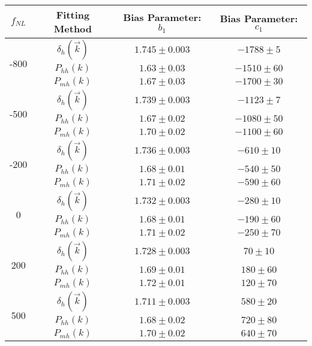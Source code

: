 \documentclass[10pt,letterpaper,final]{iopart}
\numberwithin{equation}{subsection}
\begin{document}
\begin{table}[!htb]
\begin{center}
	\begin{tabular}{ | c | c | c | c |}
	
	\hline 
	\textbf{$f_{NL}$} & \textbf{Fitting Method} & \textbf{Bias Parameter: $b_1$} & \textbf{Bias Parameter: $c_1$} \\ \hline \hline
	
	\multirow{3}{*}{-800} &$\delta_h(\vec{k})$ & $1.745 \pm 0.003$ & $-1788 \pm 5$\\ \cline{2-4}
	&$P_{hh}(k)$ & $1.63 \pm 0.03$ & $-1510 \pm 60$ \\ \cline{2-4}
	&$P_{mh}(k)$ & $1.67 \pm 0.03$ & $-1700 \pm 30$ \\ \hline \hline
	
	\multirow{3}{*}{-500} &$\delta_h(\vec{k})$ & $1.739 \pm 0.003$ & $-1123 \pm 7$\\ \cline{2-4}
	&$P_{hh}(k)$ & $1.67 \pm 0.02$ & $-1080 \pm 50$\\ \cline{2-4}
	&$P_{mh}(k)$ & $1.70 \pm 0.02$ & $-1100 \pm 60$ \\ \hline \hline
	
	\multirow{3}{*}{-200} &$\delta_h(\vec{k})$ & $1.736 \pm 0.003$ & $-610 \pm 10$\\ \cline{2-4}
	&$P_{hh}(k)$ & $1.68 \pm 0.01$ & $-540 \pm 50$ \\ \cline{2-4}
	&$P_{mh}(k)$ & $1.71 \pm 0.02$ & $-590 \pm 60$ \\ \hline \hline
	
	\multirow{3}{*}{0} &$\delta_h(\vec{k})$ & $1.732 \pm 0.003$  & $-280 \pm 10 $\\ \cline{2-4}
	&$P_{hh}(k)$ & $1.68 \pm 0.01$ & $-190 \pm 60$ \\ \cline{2-4}
	&$P_{mh}(k)$ & $1.71 \pm 0.02$ & $-250 \pm 70$ \\ \hline \hline
	
	\multirow{3}{*}{200} &$\delta_h(\vec{k})$ & $1.728 \pm 0.003$ & $70 \pm 10$\\ \cline{2-4}
	&$P_{hh}(k)$ & $1.69 \pm 0.01$ & $180 \pm 60$ \\ \cline{2-4}
	&$P_{mh}(k)$ & $1.72 \pm 0.01$ & $120 \pm 70 $\\ \hline \hline
	
	\multirow{3}{*}{500} &$\delta_h(\vec{k})$ & $1.711 \pm 0.003$ & $580 \pm 20$\\ \cline{2-4}
	&$P_{hh}(k)$ & $1.68 \pm 0.02$ & $720 \pm 80$\\ \cline{2-4}
	&$P_{mh}(k)$ & $1.70 \pm 0.02$ & $640 \pm 70$\\ \hline \hline
	

\end{tabular}
\end{center}
\end{table}
\end{document}

